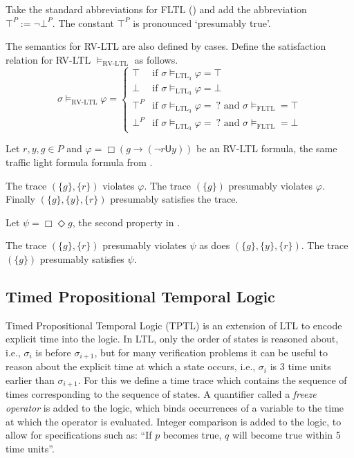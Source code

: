 \documentclass[a4paper]{article}
\newcommand{\U}{\mathsf{U}}
\newcommand{\tand}{\text{ and }}
\newcommand{\ltlt}{LTL$_3$}
\begin{document}
\begin{notn}

  Take the standard abbreviations for FLTL () and add the abbreviation $\top^P := \neg \bot^P$. The constant $\top^P$ is pronounced `presumably true'.
\end{notn}

\begin{defn}\label{rvltlsem}

  The semantics for RV-LTL are also defined by cases.
  Define the satisfaction relation for RV-LTL $\vDash_{\text{RV-LTL}}$ as follows.
  \[\sigma\vDash_{\text{RV-LTL}}\varphi =
    \begin{cases}
      \top & \text{if } \sigma \vDash_{\text{\ltlt}} \varphi = \top\\
      \bot & \text{if } \sigma \vDash_{\text{\ltlt}} \varphi = \bot\\
      \top^P & \text{if } \sigma \vDash_{\text{\ltlt}} \varphi = ~?\tand \sigma\vDash_{\text{FLTL}} = \top \\
      \bot^P & \text{if } \sigma \vDash_{\text{\ltlt}} \varphi = ~?\tand \sigma\vDash_{\text{FLTL}} = \bot
    \end{cases}
  \]
\end{defn}

\begin{eg}
Let $r,y,g\in P$ and $\varphi = \Box (g \to (\neg r \U y))$ be an RV-LTL formula, the same traffic light formula formula from .

  The trace $(\{g\},\{r\})$ violates $\varphi$. The trace $(\{g\})$ presumably violates $\varphi$. Finally $(\{g\},\{y\},\{r\})$ presumably satisfies the trace.

  Let $\psi = \Box \Diamond g $, the second property in .

  The trace $(\{g\},\{r\})$ presumably violates $\psi$ as does $(\{g\},\{y\},\{r\})$. The trace $(\{g\})$ presumably satisfies $\psi$.
\end{eg}

\subsection{Timed Propositional Temporal Logic}
Timed Propositional Temporal Logic (TPTL)\autocite{alur1994really} is an extension of LTL to encode explicit time into the logic.
In LTL, only the order of states is reasoned about, i.e., $\sigma_i$ is before $\sigma_{i+1}$, but for many verification problems it can be useful to reason about the explicit time at which a state occurs, i.e., $\sigma_i$ is 3 time units earlier than $\sigma_{i+1}$.
For this we define a time trace which contains the sequence of times corresponding to the sequence of states.
A quantifier called a \emph{freeze operator} is added to the logic, which binds occurrences of a variable to the time at which the operator is evaluated.
Integer comparison is added to the logic, to allow for specifications such as: ``If $p$ becomes true, $q$ will become true within 5 time units''.
\end{document}
